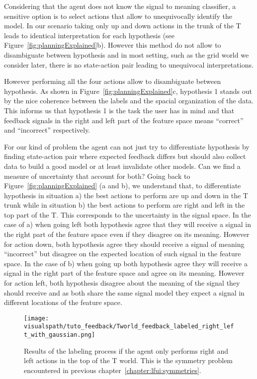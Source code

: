 Considering that the agent does not know the signal to meaning classifier, a sensitive option is to select actions that allow to unequivocally identify the model. In our scenario taking only up and down actions in the trunk of the T leads to identical interpretation for each hypothesis (see Figure~\ref{fig:planningExplained}b). However this method do not allow to disambiguate between hypothesis and in most setting, such as the grid world we consider later, there is no state-action pair leading to unequivocal interpretations.

However performing all the four actions allow to disambiguate between hypothesis. As shown in Figure~\ref{fig:planningExplained}c, hypothesis 1 stands out by the nice coherence between the labels and the spacial organization of the data. This informs us that hypothesis 1 is the task the user has in mind and that feedback signals in the right and left part of the feature space means ``correct'' and ``incorrect'' respectively.

For our kind of problem the agent can not just try to differentiate hypothesis by finding state-action pair where expected feedback differs but should also collect data to build a good model or at least invalidate other models. Can we find a measure of uncertainty that account for both? Going back to Figure~\ref{fig:planningExplained} (a and b), we understand that, to differentiate hypothesis in situation a) the best actions to perform are up and down in the T trunk while in situation b) the best actions to perform are right and left in the top part of the T. This corresponds to the uncertainty in the signal space. In the case of a) when going left both hypothesis agree that they will receive a signal in the right part of the feature space even if they disagree on its meaning. However for action down, both hypothesis agree they should receive a signal of meaning ``incorrect'' but disagree on the expected location of such signal in the feature space. In the case of b) when going up both hypothesis agree they will receive a signal in the right part of the feature space and agree on its meaning. However for action left, both hypothesis disagree about the meaning of the signal they should receive and as both share the same signal model they expect a signal in different locations of the feature space.


\begin{figure}[!ht]
  \centering
  \texttt{[image: \\visualspath/tuto\_feedback/Tworld\_feedback\_labeled\_right\_left\_with\_gaussian.png]}
  \caption{Results of the labeling process if the agent only performs right and left actions in the top of the T world. This is the symmetry problem encountered in previous chapter~\ref{chapter:lfui:symmetries}.}
  \label{fig:planningrightleft}
\end{figure}

